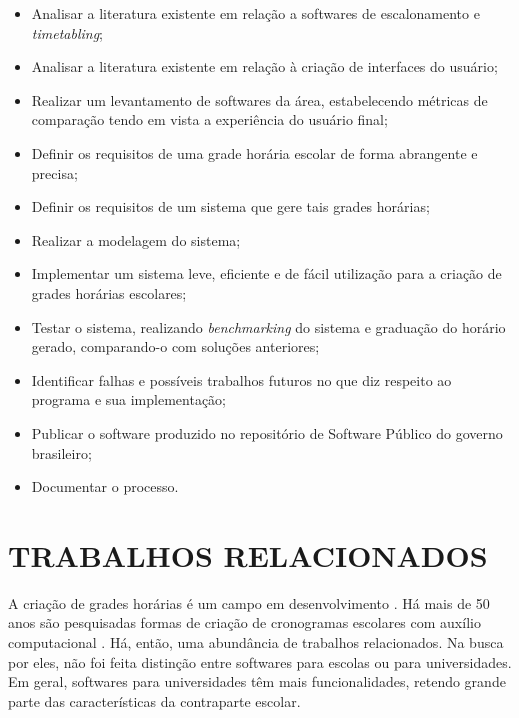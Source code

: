 \documentclass[12pt,a4paper]{article}
\begin{document}
				\begin{itemize}
					\item Analisar a literatura existente em relação a softwares de escalonamento e \textit{timetabling};
					\item Analisar a literatura existente em relação à criação de interfaces do usuário;
					\item Realizar um levantamento de softwares da área, estabelecendo métricas de comparação tendo em vista a experiência do usuário final;
					\item Definir os requisitos de uma grade horária escolar de forma abrangente e precisa;
					\item Definir os requisitos de um sistema que gere tais grades horárias;
					\item Realizar a modelagem do sistema;
					\item Implementar um sistema leve, eficiente e de fácil utilização para a criação de grades horárias escolares;
					\item Testar o sistema, realizando \textit{benchmarking} do sistema e graduação do horário gerado, comparando-o com soluções anteriores;
					\item Identificar falhas e possíveis trabalhos futuros no que diz respeito ao programa e sua implementação;
					\item Publicar o software produzido no repositório de Software Público do governo brasileiro;
					\item Documentar o processo.
				\end{itemize}

	\clearpage

	\section{TRABALHOS RELACIONADOS}

		\par A criação de grades horárias é um campo em desenvolvimento \cite{patat2020}. Há mais de 50 anos são pesquisadas formas de criação de cronogramas escolares com auxílio computacional \cite{appleby}. Há, então, uma abundância de trabalhos relacionados. Na busca por eles, não foi feita distinção entre softwares para escolas ou para universidades. Em geral, softwares para universidades têm mais funcionalidades, retendo grande parte das características da contraparte escolar.
\end{document}
